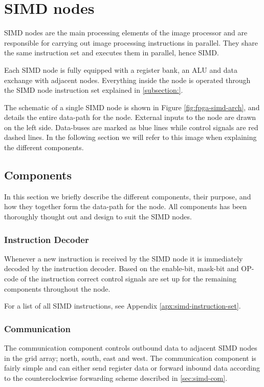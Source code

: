 \section{SIMD nodes}

\ac{SIMD} nodes are the main processing elements of the image processor and are
responsible for carrying out image processing instructions in parallel. They
share the same instruction set and executes them in parallel, hence
\acf{SIMD}.

Each \ac{SIMD} node is fully equipped with a register bank,
an \ac{ALU} and data exchange with adjacent nodes.
Everything inside the node is operated through the SIMD node
instruction set explained in \ref{subsection:}.

The schematic of a single \ac{SIMD} node is shown in Figure
\ref{fig:fpga-simd-arch}, and details the entire data-path for the
node. External inputs to the node are drawn on the left side. Data-buses are 
marked as blue lines while control signals are red dashed lines. In the 
following section we will refer to this image when explaining the different 
components.



\subsection{Components}
In this section we briefly describe the different components, their purpose, and
how they together form the data-path for the node. All components has been thoroughly
thought out and design to suit the \ac{SIMD} nodes.  

\subsubsection{Instruction Decoder}
Whenever a new instruction is received by the \ac{SIMD} node it is immediately 
decoded by the instruction decoder. Based on the enable-bit, mask-bit and OP-code
of the instruction correct control signals are set up for the remaining components
throughout the node.

For a list of all \ac{SIMD} instructions, see Appendix \ref{apx:simd-instruction-set}.

\subsubsection{Communication}
The communication component controls outbound data to adjacent \ac{SIMD} nodes in 
the grid array; north, south, east and west. The communication component is fairly 
simple and can either send register data or forward inbound data according to the counterclockwise forwarding scheme described in \ref{sec:simd-com}.


